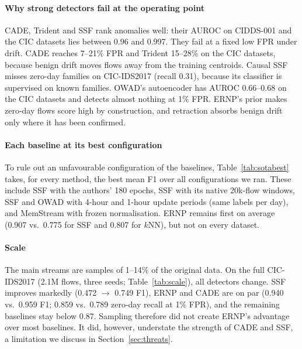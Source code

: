 \documentclass[preprint,12pt]{elsarticle}
\begin{document}
\paragraph{Why strong detectors fail at the operating point}
CADE, Trident and SSF rank anomalies well: their AUROC on CIDDS-001 and the CIC datasets lies between 0.96 and 0.997. They fail at a fixed low FPR under drift. CADE reaches 7--21\% FPR and Trident 15--28\% on the CIC datasets, because benign drift moves flows away from the training centroids. Causal SSF misses zero-day families on CIC-IDS2017 (recall 0.31), because its classifier is supervised on known families. OWAD's autoencoder has AUROC 0.66--0.68 on the CIC datasets and detects almost nothing at 1\% FPR. ERNP's prior makes zero-day flows score high by construction, and retraction absorbs benign drift only where it has been confirmed.

\paragraph{Each baseline at its best configuration}
To rule out an unfavourable configuration of the baselines, Table~\ref{tab:sotabest} takes, for every method, the best mean F1 over all configurations we ran. These include SSF with the authors' 180 epochs, SSF with its native 20k-flow windows, SSF and OWAD with 4-hour and 1-hour update periods (same labels per day), and MemStream with frozen normalisation. ERNP remains first on average (0.907 vs.\ 0.775 for SSF and 0.807 for $k$NN), but not on every dataset.

\begin{table}[t]
\centering\small
\caption{Best configuration of each method (mean F1). SSF: epochs 20/180, native windows, 4\,h/1\,h updates; OWAD: 24/4/1\,h updates; MemStream: original/frozen normalisation; ERNP: 24/4/1\,h updates.}\label{tab:sotabest}
\resizebox{\linewidth}{!}{}
\end{table}

\paragraph{Scale}
The main streams are samples of 1--14\% of the original data. On the full CIC-IDS2017 (2.1M flows, three seeds; Table~\ref{tab:scale}), all detectors change. SSF improves markedly (0.472 $\rightarrow$ 0.749 F1), ERNP and CADE are on par (0.940 vs.\ 0.959 F1; 0.859 vs.\ 0.789 zero-day recall at 1\% FPR), and the remaining baselines stay below 0.87. Sampling therefore did not create ERNP's advantage over most baselines. It did, however, understate the strength of CADE and SSF, a limitation we discuss in Section~\ref{sec:threats}.
\end{document}

